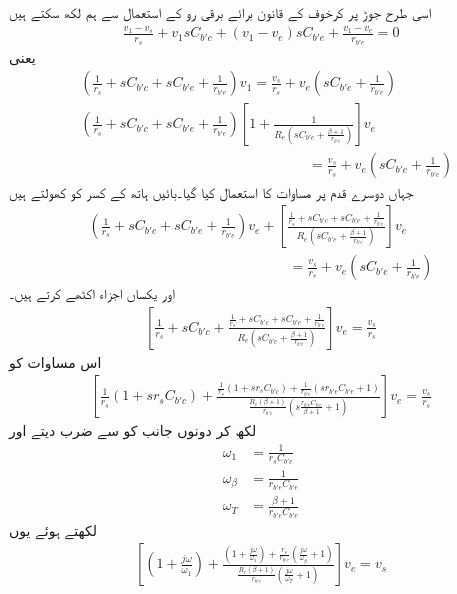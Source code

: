 اسی طرح جوڑ  پر کرخوف کے قانون برائے برقی رو کے استعمال سے ہم لکھ سکتے ہیں
\begin{align*}
\frac{v_1-v_s}{r_s}+v_1 sC_{b'c} +\left(v_1-v_e\right) sC_{b'e}+\frac{v_1-v_e}{r_{b'e}}=0
\end{align*}
یعنی
\begin{align*}
&\left(\frac{1}{r_s}+sC_{b'c}+sC_{b'e}+\frac{1}{r_{b'e}} \right) v_1=\frac{v_s}{r_s}+v_e \left(sC_{b'e}+\frac{1}{r_{b'e}} \right)\\
&\left(\frac{1}{r_s}+sC_{b'c}+sC_{b'e}+\frac{1}{r_{b'e}} \right) \left[1+\frac{1}{R_e \left(sC_{b'e}+\frac{\beta+1}{r_{b'e}}\right)}\right] v_e\\
&\hspace{6cm}\qquad{}=\frac{v_s}{r_s}+v_e \left(sC_{b'e}+\frac{1}{r_{b'e}} \right)
\end{align*}
جہاں دوسرے قدم پر مساوات  کا استعمال کیا گیا۔بائیں ہاتھ کے کسر کو کھولتے ہیں
\begin{align*}
\left(\frac{1}{r_s}+sC_{b'c}+sC_{b'e}+\frac{1}{r_{b'e}} \right) v_e +\left[\frac{\frac{1}{r_s}+sC_{b'c}+sC_{b'e}+\frac{1}{r_{b'e}}}{R_e \left(sC_{b'e}+\frac{\beta+1}{r_{b'e}} \right)}\right] v_e\\
\hspace{6cm} =\frac{v_s}{r_s}+v_e \left(sC_{b'e}+\frac{1}{r_{b'e}} \right)
\end{align*}
اور یکساں اجزاء اکٹھے کرتے ہیں۔
\begin{align*}
\left[\frac{1}{r_s}+sC_{b'c}+\frac{\frac{1}{r_s}+sC_{b'c}+sC_{b'e}+\frac{1}{r_{b'e}}}{R_e \left(sC_{b'e}+\frac{\beta+1}{r_{b'e}} \right)}\right] v_e=\frac{v_s}{r_s}
\end{align*}
اس مساوات کو
\begin{align*}
\left[\frac{1}{r_s}\left(1+s r_s C_{b'c}\right)+\frac{\frac{1}{r_s}\left(1+s r_s C_{b'c}\right)+\frac{1}{r_{b'e}}\left(s r_{b'e}C_{b'e}+1\right)}{\frac{R_e\left(\beta+1 \right)}{r_{b'e}} \left(s \frac{r_{b'e}C_{b'e}}{\beta+1}+1 \right)}\right] v_e=\frac{v_s}{r_s}
\end{align*}
لکھ کر دونوں جانب کو  سے ضرب دیتے اور 
\begin{align}
\omega_1&=\frac{1}{r_s C_{b'c}}\\
\omega_{\beta}&=\frac{1}{r_{b'e} C_{b'e}}\\
\omega_T&=\frac{\beta+1}{r_{b'e}C_{b'e}}
\end{align}
لکھتے ہوئے یوں
\begin{align*}
\left[\left(1+\frac{j \omega}{\omega_1}\right)+\frac{\left(1+\frac{j \omega}{\omega_1}\right)+\frac{r_s}{r_{b'e}}\left(\frac{j \omega}{\omega_{\beta}}+1\right)}{\frac{R_e\left(\beta+1 \right)}{r_{b'e}} \left(\frac{j \omega}{\omega_T}+1 \right)}\right] v_e=v_s
\end{align*}
